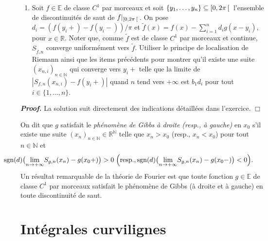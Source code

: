 \documentclass[11pt,a4paper]{article}
\newcommand{\NN}{\mathbb{N}}
\newcommand{\RR}{\mathbb{R}}
\newenvironment{preuve}[1][]
{\vskip 2mm  \noindent\emph{\bf Proof#1. }}{$\Box$ \vskip 2mm}
\newcounter{exercice}
\begin{document}
\begin{enumerate}
		\item Soit $f \in \mathbb{E}$ de classe $C^{1}$ par morceaux et soit $\{ y_{1}, \dots, y_{n} \} \subseteq [0,2\pi \hskip 0.6mm [ \hskip 0.6mm$ l'ensemble de discontinuités de saut de $f|_{[0,2\pi \hskip 0.6mm [ \hskip 0.6mm}$. 
		On pose $d_{i} = (f(y_{i}+) - f(y_{i}-))/\pi$ et $\tilde{f}(x) = f(x) - \sum_{i=1}^{n} d_{i} g(x-y_{i})$, pour $x \in \RR$. 
		Noter que, comme $\tilde{f}$ est de classe $C^{1}$ par morceaux et continue, $S_{\tilde{f},n}$ converge uniformément vers 
		$\tilde{f}$. 
		Utiliser le principe de localisation de Riemann ainsi que les items précédents pour montrer qu'il existe une suite $(x_{n,i})_{n \in \NN}$ qui converge vers $y_{i}+$ telle que la limite de $|S_{f,n}(x_{n,i}) - f(y_{i}+)|$ quand $n$ tend vers $+ \infty$ est $b_{1} d_{i}$ pour tout $i \in \{ 1, \dots, n\}$. 
	\end{enumerate}


\begin{preuve}
	La solution suit directement des indications détaillées dans l'exercice. 
\end{preuve}





On dit que $g$ satisfait le \emph{phénomène de Gibbs à droite (resp., à gauche)} en $x_{0}$ s'il existe une suite $(x_{n})_{n \in \NN} \in \RR^{\NN}$ telle que $x_{n} > x_{0}$ (resp., $x_{n} < x_{0}$) pour tout $n \in \NN$ et 
\[     \hskip - 1.5cm \operatorname{sgn}(d) \big(\underset{n \rightarrow + \infty}{\lim} S_{g,n}(x_{n}) - g(x_{0}+)\big) > 0 \hskip 1mm \Big(\text{resp.,} \operatorname{sgn}(d) \big( \underset{n \rightarrow + \infty}{\lim} S_{g,n}(x_{n}) - g(x_{0}-)\big) < 0 \Big).     \]
Un résultat remarquable de la théorie de Fourier est que toute fonction $g \in \mathbb{E}$ de classe $C^{1}$ par morceaux satisfait le phénomène de Gibbs (à droite et à gauche) en toute discontinuité de saut. 

\newpage \section{Intégrales curvilignes}
\end{document}

